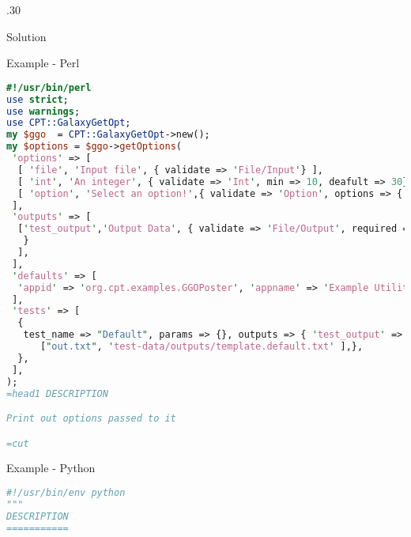 \documentclass[final,t,20pt]{beamer}
\begin{document}
\begin{frame}[fragile]
\begin{columns}[t]
\begin{column}{.30\linewidth}
\begin{block}{Solution}
\begin{itemize}
                \end{itemize}
            \end{block}
            \begin{block}{Example - Perl}
                \tiny
                \begin{lstlisting}[language=perl]
#!/usr/bin/perl
use strict;
use warnings;
use CPT::GalaxyGetOpt;
my $ggo  = CPT::GalaxyGetOpt->new();
my $options = $ggo->getOptions(
 'options' => [
  [ 'file', 'Input file', { validate => 'File/Input'} ],
  [ 'int', 'An integer', { validate => 'Int', min => 10, deafult => 30}],
  [ 'option', 'Select an option!',{ validate => 'Option', options => { 'a' => 'Alpha', 'b' => 'Bravo' }, multiple => 1 } ],
 ],
 'outputs' => [
  ['test_output','Output Data', { validate => 'File/Output', required => 1, default => 'out', data_format => 'text/plain', default_format => 'TXT'
   }
  ],
 ],
 'defaults' => [
  'appid' => 'org.cpt.examples.GGOPoster', 'appname' => 'Example Utility', 'appdesc' => 'prints out options passed to it', 'appvers' => '1.0.0',
 ],
 'tests' => [
  {
   test_name => "Default", params => {}, outputs => { 'test_output' =>
      ["out.txt", 'test-data/outputs/template.default.txt' ],},
  },
 ],
);
=head1 DESCRIPTION

Print out options passed to it

=cut
                \end{lstlisting}
            \end{block}
            \begin{block}{Example - Python}
                \tiny
                \begin{lstlisting}[language=python]
#!/usr/bin/env python
"""
DESCRIPTION
===========


\end{lstlisting}
\end{block}
\end{column}
\end{columns}
\end{frame}
\end{document}
